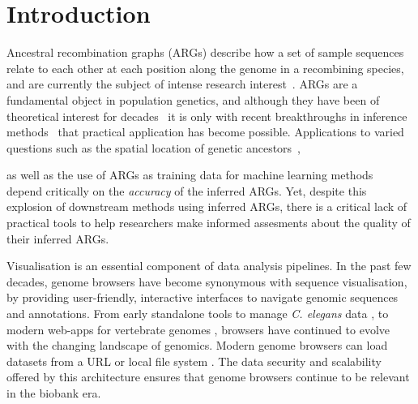 \documentclass[unnumsec,webpdf,contemporary,large,namedate]{oup-authoring-template}%
\begin{document}
 \maketitle 

\section{Introduction} 
Ancestral recombination graphs (ARGs) describe how a set of sample
sequences relate to each other at each position along the genome in a recombining
species, and are currently the subject of intense research 
interest~\citep{brandt2024promise,lewanski2024era,nielsen2024inference,
wong2024general}. ARGs are a fundamental object in population genetics,
and although they have been of theoretical interest for
decades~\citep{Hudson1983,Griffiths1997} it is only with recent breakthroughs
in inference methods~\citep{rasmussen2014genome,
speidel2019method,kelleher2019inferring,wohns2022unified,zhang2023biobank,
gunnarsson2024scalable,deng2024robust} that practical application has 
become possible. Applications to varied questions such as the spatial 
location of genetic
ancestors~\citep{osmond2024estimating,deraje2024inferring,grundler2024geographic},

as well as the use of ARGs as training data for machine learning 
methods~\citep{whitehouse2024tree} depend critically on the \emph{accuracy}
of the inferred ARGs. Yet, despite this explosion of downstream methods using
inferred ARGs, there is a critical lack of practical tools to help
researchers make informed assesments about the quality of their inferred ARGs.


Visualisation
is an essential component of data analysis pipelines. In the past few decades,
genome browsers have become synonymous with sequence visualisation, by
providing user-friendly, interactive interfaces to navigate genomic sequences
and annotations. From early standalone tools to manage \textit{C. elegans} data
\citep{Eeckman1995}, to modern web-apps for vertebrate genomes
\citep{Birney2004,Rangwala2024,Nassar2023}, browsers have continued to evolve
with the changing landscape of genomics. Modern genome browsers can load
datasets from a URL or local file system \citep{Lee2013,Robinson2023}.
The data security and scalability offered by this architecture ensures that
genome browsers continue to be relevant in the biobank era.
\end{document}
